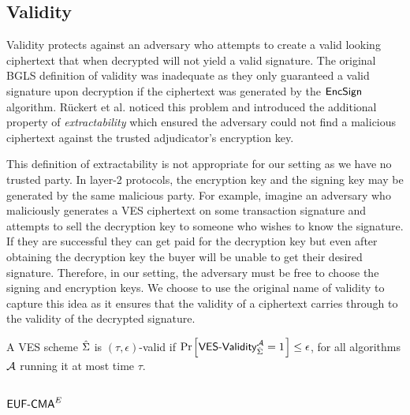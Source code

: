 \subsection{Validity}

Validity protects against an adversary who attempts to create a valid looking ciphertext that when decrypted will not yield a valid signature.
The original BGLS definition of validity was inadequate as they only guaranteed a valid signature upon decryption if the ciphertext was generated by the $\textsf{EncSign}$ algorithm.
Rückert et al. \cite{Ruckert:2009:SVE:1615384.1615387} noticed this problem and introduced the additional property of \emph{extractability} which ensured the adversary could not find a malicious ciphertext against the trusted adjudicator's encryption key.

This definition of extractability is not appropriate for our setting as we have no trusted party.
In layer-2 protocols, the encryption key and the signing key may be generated by the same malicious party.
For example, imagine an adversary who maliciously generates a VES ciphertext on some transaction signature and attempts to sell the decryption key to someone who wishes to know the signature.
If they are successful they can get paid for the decryption key but even after obtaining the decryption key the buyer will be unable to get their desired signature.
Therefore, in our setting, the adversary must be free to choose the signing and encryption keys.
We choose to use the original name of validity to capture this idea as it ensures that the validity of a ciphertext carries through to the validity of the decrypted signature.

\begin{definition}[Validity]
 A VES scheme $\hat{\Sigma}$ is $(\tau, \epsilon)$-valid if $\prob{\textsf{VES-Validity}^{\adv}_{\hatSigma} = 1} \leq \epsilon$, for all algorithms $\mathcal{A}$ running it at most time $\tau$.
\begin{center}
\end{center}
\end{definition}
\subsection{$\textsf{EUF-CMA}^E$}

